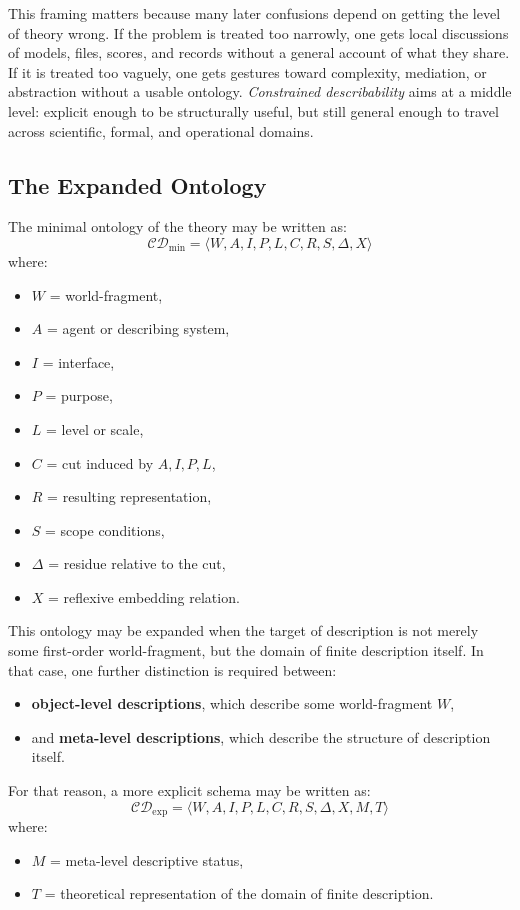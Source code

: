 \documentclass[11pt]{article}
\renewcommand{\emph}[1]{\textit{#1}}
\begin{document}
This framing matters because many later confusions depend on getting the level of theory wrong. If the problem is treated too narrowly, one gets local discussions of models, files, scores, and records without a general account of what they share. If it is treated too vaguely, one gets gestures toward complexity, mediation, or abstraction without a usable ontology. \emph{Constrained describability} aims at a middle level: explicit enough to be structurally useful, but still general enough to travel across scientific, formal, and operational domains.

\subsection{The Expanded Ontology}

The minimal ontology of the theory may be written as:
\[
\mathcal{CD}_{\min}=\langle W, A, I, P, L, C, R, S, \Delta, X \rangle
\]
where:
\begin{itemize}
    \item \(W\) = world-fragment,
    \item \(A\) = agent or describing system,
    \item \(I\) = interface,
    \item \(P\) = purpose,
    \item \(L\) = level or scale,
    \item \(C\) = cut induced by \(A,I,P,L\),
    \item \(R\) = resulting representation,
    \item \(S\) = scope conditions,
    \item \(\Delta\) = residue relative to the cut,
    \item \(X\) = reflexive embedding relation.
\end{itemize}

This ontology may be expanded when the target of description is not merely some first-order world-fragment, but the domain of finite description itself. In that case, one further distinction is required between:
\begin{itemize}
    \item \textbf{object-level descriptions}, which describe some world-fragment \(W\),
    \item and \textbf{meta-level descriptions}, which describe the structure of description itself.
\end{itemize}

For that reason, a more explicit schema may be written as:
\[
\mathcal{CD}_{\exp}=\langle W, A, I, P, L, C, R, S, \Delta, X, M, T \rangle
\]
where:
\begin{itemize}
    \item \(M\) = meta-level descriptive status,
    \item \(T\) = theoretical representation of the domain of finite description.
\end{itemize}
\end{document}
